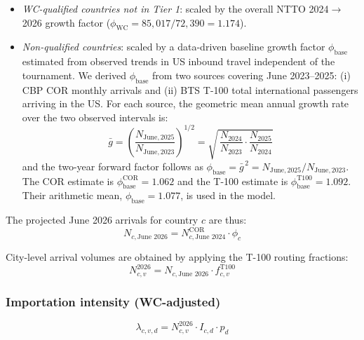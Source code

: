 \documentclass[12pt]{article}
\begin{document}
\begin{itemize}
  \item \emph{WC-qualified countries not in Tier 1}: scaled by the
    overall NTTO 2024$\to$2026 growth factor ($\phi_{\text{WC}} =
    85{,}017/72{,}390 = 1.174$).
  \item \emph{Non-qualified countries}: scaled by a data-driven
    baseline growth factor $\phi_{\text{base}}$ estimated from
    observed trends in US inbound travel independent of the
    tournament. We derived $\phi_{\text{base}}$ from two sources
    covering June 2023--2025: (i) CBP COR monthly arrivals and (ii)
    BTS T-100 total international passengers arriving in the US.
    For each source, the geometric mean annual growth rate over the
    two observed intervals is:
    \begin{equation}
      \bar{g} = \left(\frac{N_{\text{June},2025}}{N_{\text{June},2023}}
               \right)^{1/2}
               = \sqrt{\,\frac{N_{2024}}{N_{2023}} \cdot
                              \frac{N_{2025}}{N_{2024}}}
      \label{eq:gbar}
    \end{equation}
    and the two-year forward factor follows as $\phi_{\text{base}} =
    \bar{g}^{\,2} = N_{\text{June},2025} / N_{\text{June},2023}$.
    The COR estimate is $\phi_{\text{base}}^{\text{COR}} = 1.062$
    and the T-100 estimate is $\phi_{\text{base}}^{\text{T100}} = 1.092$.
    Their arithmetic mean, $\phi_{\text{base}} = 1.077$, is used in
    the model.
\end{itemize}

The projected June 2026 arrivals for country $c$ are thus:
\begin{equation}
  N_{c,\text{June 2026}} = N_{c,\text{June 2024}}^{\text{COR}}
  \cdot \phi_c
  \label{eq:travel_wc}
\end{equation}

City-level arrival volumes are obtained by applying the T-100 routing
fractions:
\begin{equation}
  N_{c,v}^{2026} = N_{c,\text{June 2026}} \cdot f_{c,v}^{\text{T100}}
  \label{eq:routing_wc}
\end{equation}

\subsubsection*{Importation intensity (WC-adjusted)}

\begin{equation}
  \lambda_{c,v,d} = N_{c,v}^{2026} \cdot I_{c,d} \cdot p_d
\end{equation}
\end{document}
